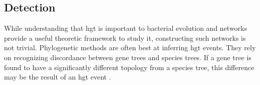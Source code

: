 \subsection{Detection}%
While understanding that \ac{hgt} is important to bacterial evolution and networks provide a useful theoretic framework to study it, constructing such networks is not trivial.
Phylogenetic methods are often best at inferring \ac{hgt} events.
They rely on recognizing discordance between gene trees and species trees.
If a gene tree is found to have a significantly different topology from a species tree, this difference may be the result of an \ac{hgt} event \citep{hgterr}.
